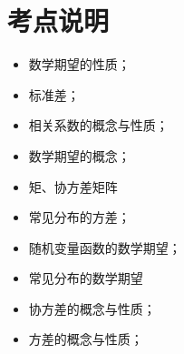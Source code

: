 \section{考点说明}
\begin{itemize}
\item 数学期望的性质；
\item 标准差；
\item 相关系数的概念与性质；
\item 数学期望的概念；
\item 矩、协方差矩阵
\item 常见分布的方差；
\item 随机变量函数的数学期望；
\item 常见分布的数学期望
\item 协方差的概念与性质；
\item 方差的概念与性质；
\end{itemize}


